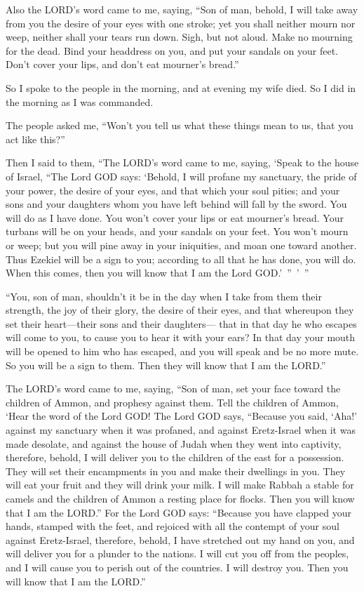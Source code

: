 \myverse{}Also the LORD’s word came to me, saying,
\myverse{}“Son of man, behold, I will take away from you the desire of your eyes with
one stroke; yet you shall neither mourn nor weep, neither shall your tears run down.
\myverse{}Sigh, but not aloud. Make no mourning for the dead. Bind your headdress on
you, and put your sandals on your feet. Don’t cover your lips, and don’t eat mourner’s bread.”

\myverse{}So I spoke to the people in the morning, and at evening my wife
died. So I did in the morning as I was commanded.

\myverse{}The people asked me, “Won’t you tell us what these things mean
to us, that you act like this?”

\myverse{}Then I said to them, “The LORD’s word came to me, saying,
\myverse{}‘Speak to the house of Israel, “The Lord GOD says: ‘Behold, I will profane
my sanctuary, the pride of your power, the desire of your eyes, and that which your soul pities; and your
sons and your daughters whom you have left behind will fall by the sword.
\myverse{}You will do as I have done. You won’t cover your lips or eat mourner’s bread.
\myverse{}Your turbans will be on your heads, and your sandals on your feet. You won’t
mourn or weep; but you will pine away in your iniquities, and moan one toward another.
\myverse{}Thus Ezekiel will be a sign to you; according to all that he has done, you
will do. When this comes, then you will know that I am the Lord GOD.’ ” ’ ”

\myverse{}“You, son of man, shouldn’t it be in the day when I take from
them their strength, the joy of their glory, the desire of their eyes, and that whereupon they set their
heart—their sons and their daughters—
\myverse{}that in that day he who escapes will come to you, to cause you to hear it
with your ears?
\myverse{}In that day your mouth will be opened to him who has escaped, and you will
speak and be no more mute. So you will be a sign to them. Then they will know that I am the LORD.”


\mychapter{} \myverse*{}The LORD’s word came to me, saying,
\myverse{}“Son of man, set your face toward the children of Ammon, and prophesy against
them.
\myverse{}Tell the children of Ammon, ‘Hear the word of the Lord GOD! The Lord GOD says,
“Because you said, ‘Aha!’ against my sanctuary when it was profaned, and against Eretz-Israel when it
was made desolate, and against the house of Judah when they went into captivity,
\myverse{}therefore, behold, I will deliver you to the children of the east for a possession.
They will set their encampments in you and make their dwellings in you. They will eat your fruit and they
will drink your milk.
\myverse{}I will make Rabbah a stable for camels and the children of Ammon a resting
place for flocks. Then you will know that I am the LORD.”
\myverse{}For the Lord GOD says: “Because you have clapped your hands, stamped with the
feet, and rejoiced with all the contempt of your soul against Eretz-Israel,
\myverse{}therefore, behold, I have stretched out my hand on you, and will deliver you
for a plunder to the nations. I will cut you off from the peoples, and I will cause you to perish out
of the countries. I will destroy you. Then you will know that I am the LORD.”


